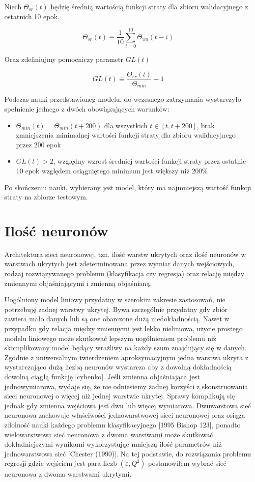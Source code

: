 \documentclass[]{article}
\theoremstyle{definition}
\begin{document}
 Niech $\Theta_{sr}(t)$ będzię średnią wartością funkcji straty dla zbioru walidacyjnego z ostatnich 10 epok.
 
 $$
 \Theta_{sr}(t) \equiv \frac{1}{10} \sum_{i=0}^{10} \Theta_{wa}(t-i)
 $$
 
 Oraz zdefiniujmy pomocniczy parametr $GL(t)$
 
 
 $$
 GL(t) \equiv \frac{\Theta_{sr}(t)}{\Theta_{min}} - 1
 $$
 
 
 Podczas nauki przedstawioneg modelu, do wczesnego zatrzymania wystarczyło spełnienie jednego z dwóch obowiązujących warunków:

\begin{itemize}
\item $\Theta_{min}(t) = \Theta_{min}(t+ 200)$ dla wszystkich $t \in [t,t+200]$, brak zmniejszenia minimalnej wartości funkcji straty dla zbioru walidacyjnego przez 200 epok 
\item $ GL(t)  > 2$, względny wzrost średniej wartości funkcji straty przez ostatnie 10 epok względem osiągniętego minimum jest większy niż $200\%$
\end{itemize}

Po skończeniu nauki, wybierany jest model, który ma najmniejszą wartość funkcji straty na zbiorze testowym.

\section{Ilość neuronów}

Architektura sieci neuronowej, tzn. ilość warstw ukrytych oraz ilość neuronów w warstwach ukrytych jest zdeterminowana przez wymiar danych wejściowych, rodzaj rozwiązywanego problemu (klasyfikacja czy regresja) oraz relację między zmiennymi objaśniającymi i zmienną objaśnianą.

Uogólniony model liniowy przydatny w szerokim zakresie zastosowań, nie potrzebuję żadnej warstwy ukrytej. Bywa szczególnie przydatny gdy zbiór zawiera mało danych lub są one obarczone dużą niedokładnością. Nawet w przypadku gdy relacja między zmiennymi jest lekko nieliniowa, użycie prostego modelu liniowego może skutkować lepszym uogólnieniem problemu niż skomplikowany model będący wrażliwy na każdy szum znajdujący się w danych. Zgodnie z uniwersalnym twierdzeniem aproksymacyjnym jedna warstwa ukryta z wystarczająco dużą liczbą neuronów wystarcza aby z dowolną dokładnością dowolną ciągłą funkcję [cybenko]. Jeśli zmienna objaśniająca jest jednowymiarowa, wydaje się, że nie odniesiemy żadnej korzyści z skonstruowania sieci neuronowej o więcej niż jednej warstwie ukrytej. Sprawy komplikują się jednak gdy zmienna wejściowa jest dwu lub więcej wymiarowa. Dwuwarstowa sieć neuronowa zachowuje właściwości jednowarstwowej sieci neuronowej oraz osiąga zdolność nauki każdego problemu klasyfikacyjnego [1995 Bishop 123], ponadto wielowarstwowa sieć neuronowa z dwoma warstwami może skutkować dokładniejszymi wynikami wykorzystując mniejszą ilość parametrów niż jednowarstwowa sieć [Chester (1990)]. Na tej podstawie, do rozwiązania problemu regresji gdzie wejściem jest para liczb $(\varepsilon, Q^2)$ postanowiłem wybrać sieć neuronowa z dwoma warstwami ukrytymi. 
\end{document}
